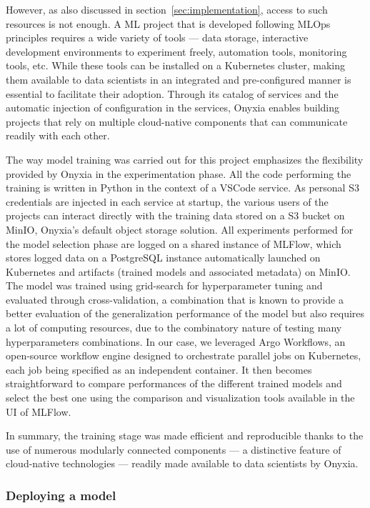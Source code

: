 However, as also discussed in section~\ref{sec:implementation}, access to such resources is not enough. A ML project that is developed following MLOps principles requires a wide variety of tools — data storage, interactive development environments to experiment freely, automation tools, monitoring tools, etc. While these tools can be installed on a Kubernetes cluster, making them available to data scientists in an integrated and pre-configured manner is essential to facilitate their adoption. Through its catalog of services and the automatic injection of configuration in the services, Onyxia enables building projects that rely on multiple cloud-native components that can communicate readily with each other.

The way model training was carried out for this project emphasizes the flexibility provided by Onyxia in the experimentation phase. All the code performing the training is written in Python in the context of a VSCode service. As personal S3 credentials are injected in each service at startup, the various users of the projects can interact directly with the training data stored on a S3 bucket on MinIO, Onyxia's default object storage solution. All experiments performed for the model selection phase are logged on a shared instance of MLFlow, which stores logged data on a PostgreSQL instance automatically launched on Kubernetes and artifacts (trained models and associated metadata) on MinIO. The model was trained using grid-search for hyperparameter tuning and evaluated through cross-validation, a combination that is known to provide a better evaluation of the generalization performance of the model but also requires a lot of computing resources, due to the combinatory nature of testing many hyperparameters combinations. In our case, we leveraged Argo Workflows, an open-source workflow engine designed to orchestrate parallel jobs on Kubernetes, each job being specified as an independent container. It then becomes straightforward to compare performances of the different trained models and select the best one using the comparison and visualization tools available in the UI of MLFlow. 

In summary, the training stage was made efficient and reproducible thanks to the use of numerous modularly connected components — a distinctive feature of cloud-native technologies — readily made available to data scientists by Onyxia.

\subsubsection{Deploying a model}

